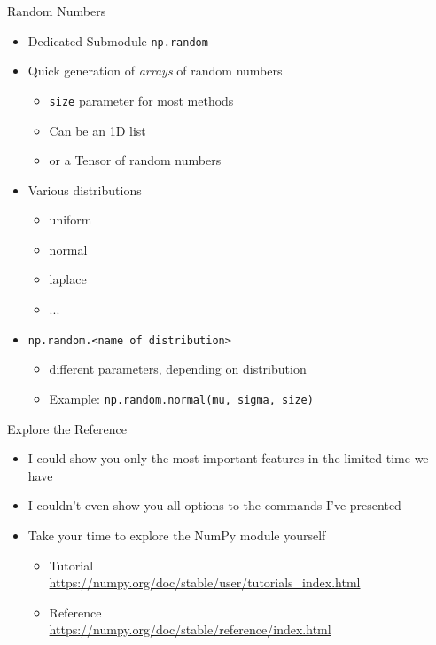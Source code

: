 
\begin{frame}{Random Numbers}
%
\begin{itemize}
\item Dedicated Submodule \texttt{np.random}
\item Quick generation of \emph{arrays} of random numbers
	\begin{itemize}
	\item \texttt{size} parameter for most methods
	\item Can be an  \Thus 1D list
	\item or a  \Thus Tensor of random numbers
	\end{itemize}
\item Various distributions
	\begin{itemize}
	\item uniform
	\item normal
	\item laplace
	\item ...
	\end{itemize}
\item \texttt{np.random.<name of distribution>}
	\begin{itemize}
	\item different parameters, depending on distribution
	\item Example: \texttt{np.random.normal(mu, sigma, size)}
	\end{itemize}
\end{itemize}
%
\end{frame}


\begin{frame}{Explore the Reference}
%
\begin{itemize}
\item I could show you only the most important features in the limited time we have
\item I couldn't even show you all options to the commands I've presented
\item[\Thus] Take your time to explore the NumPy module yourself
	\begin{itemize}
	\item Tutorial\\
		\scriptsize \url{https://numpy.org/doc/stable/user/tutorials_index.html}
	\item Reference\\
		\scriptsize \url{https://numpy.org/doc/stable/reference/index.html}
	\end{itemize}
\end{itemize}
%
\end{frame}

